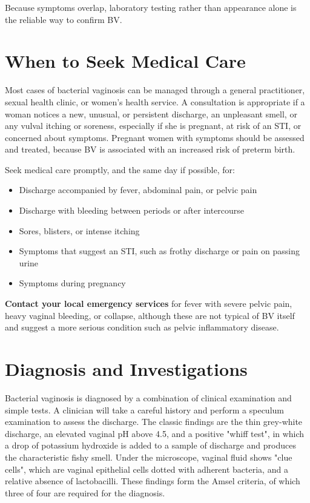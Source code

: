 Because symptoms overlap, laboratory testing rather than appearance alone is the reliable way to confirm BV.

\section*{When to Seek Medical Care}
Most cases of bacterial vaginosis can be managed through a general practitioner, sexual health clinic, or women's health service. A consultation is appropriate if a woman notices a new, unusual, or persistent discharge, an unpleasant smell, or any vulval itching or soreness, especially if she is pregnant, at risk of an STI, or concerned about symptoms. Pregnant women with symptoms should be assessed and treated, because BV is associated with an increased risk of preterm birth.

Seek medical care promptly, and the same day if possible, for:
\begin{itemize}
    \item Discharge accompanied by fever, abdominal pain, or pelvic pain
    \item Discharge with bleeding between periods or after intercourse
    \item Sores, blisters, or intense itching
    \item Symptoms that suggest an STI, such as frothy discharge or pain on passing urine
    \item Symptoms during pregnancy
\end{itemize}

\textbf{Contact your local emergency services} for fever with severe pelvic pain, heavy vaginal bleeding, or collapse, although these are not typical of BV itself and suggest a more serious condition such as pelvic inflammatory disease.

\section*{Diagnosis and Investigations}
Bacterial vaginosis is diagnosed by a combination of clinical examination and simple tests. A clinician will take a careful history and perform a speculum examination to assess the discharge. The classic findings are the thin grey-white discharge, an elevated vaginal pH above 4.5, and a positive "whiff test", in which a drop of potassium hydroxide is added to a sample of discharge and produces the characteristic fishy smell. Under the microscope, vaginal fluid shows "clue cells", which are vaginal epithelial cells dotted with adherent bacteria, and a relative absence of lactobacilli. These findings form the Amsel criteria, of which three of four are required for the diagnosis.

